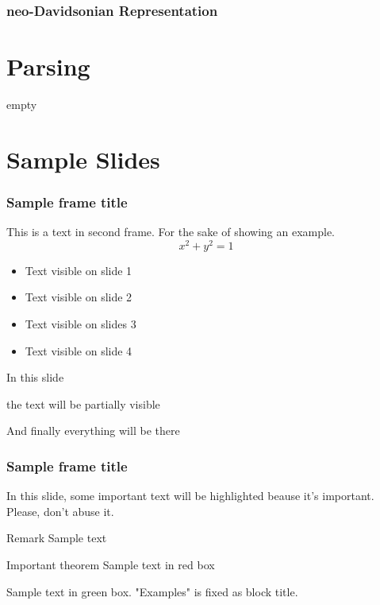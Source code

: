 \documentclass{beamer}
\begin{document}
\begin{frame}

    \frametitle{neo-Davidsonian Representation}


\end{frame}

\section{Parsing}

\begin{frame}
    empty
\end{frame}

\section{Sample Slides}

\begin{frame}
    \frametitle{Sample frame title}
    This is a text in second frame. For the sake of showing an example.
    \[
        x^2 + y^2 = 1
    \]

    \begin{itemize}
        \item <1-> Text visible on slide 1
        \item <2-> Text visible on slide 2
        \item <3> Text visible on slides 3
        \item <4-> Text visible on slide 4
    \end{itemize}

\end{frame}

\begin{frame}
In this slide \pause

the text will be partially visible \pause

And finally everything will be there
\end{frame}

\begin{frame}
    \frametitle{Sample frame title}

    In this slide, some important text will be
    \alert{highlighted} beause it's important.
    Please, don't abuse it.

    \begin{block}{Remark}
    Sample text
    \end{block}

    \begin{alertblock}{Important theorem}
    Sample text in red box
    \end{alertblock}

    \begin{examples}
    Sample text in green box. "Examples" is fixed as block title.
    \end{examples}
\end{frame}
\end{document}
